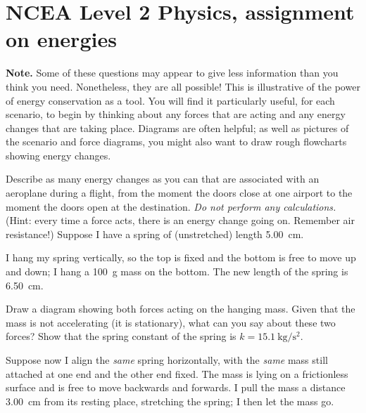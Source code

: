 \documentclass[answers]{exam}
\begin{document}
\section*{NCEA Level 2 Physics, assignment on energies}

\textbf{Note.} Some of these questions may appear to give less information than you think you need. Nonetheless,
they are all possible! This is illustrative of the power of energy conservation as a tool. You will find it particularly
useful, for each scenario, to begin by thinking about any forces that are acting and any energy changes that are
taking place. Diagrams are often helpful; as well as pictures of the scenario and force diagrams, you might also
want to draw rough flowcharts showing energy changes.

\begin{questions}
  \question Describe as many energy changes as you can that are associated with an aeroplane during a flight,
            from the moment the doors close at one airport to the moment the doors open
            at the destination. \emph{Do not perform any calculations.} (Hint: every time a force acts, there is an energy change
            going on. Remember air resistance!)
  \question Suppose I have a spring of (unstretched) length \SI{5.00}{\centi\metre}.
    \begin{parts}
      \item I hang my spring vertically, so the top is fixed and the bottom is free to
            move up and down; I hang a \SI{100}{\gram} mass on the bottom. The new
            length of the spring is \SI{6.50}{\centi\metre}.
        \begin{subparts}
          \subpart Draw a diagram showing both forces acting on the hanging mass. Given that
                   the mass is not accelerating (it is stationary), what can you say about these
                   two forces?
          \subpart Show that the spring constant of the spring is $ k = \SI{15.1}{\kilo\gram\per\second\squared} $.
        \end{subparts}
      \item Suppose now I align the \emph{same} spring horizontally, with the \emph{same} mass still attached at one end and the other end fixed.
            The mass is lying on a frictionless surface and is free to move backwards and forwards. I pull the mass a distance \SI{3.00}{\centi\metre}
            from its resting place, stretching the spring; I then let the mass go.
        \begin{subparts}

\end{subparts}
\end{parts}
\end{questions}
\end{document}

